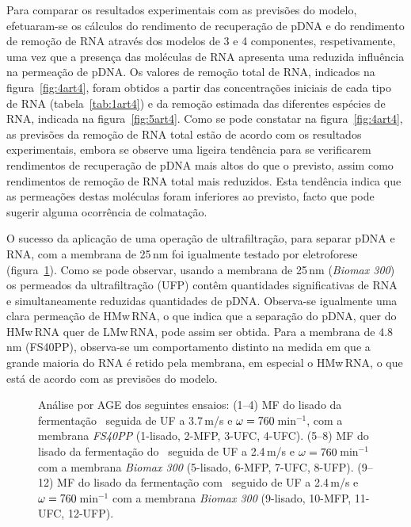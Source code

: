 Para comparar os resultados experimentais com as previsões do modelo, efetuaram-se os cálculos do rendimento de recuperação de pDNA e do rendimento de remoção de RNA através dos modelos de 3 e 4 componentes, respetivamente, uma vez que a presença das moléculas de RNA apresenta uma reduzida influência na permeação de pDNA. Os valores de remoção total de RNA, indicados na figura~\ref{fig:4art4}, foram obtidos a partir das concentrações iniciais de cada tipo de RNA (tabela~\ref{tab:1art4}) e da remoção estimada das diferentes espécies de RNA, indicada na figura~\ref{fig:5art4}. Como se pode constatar na figura~\ref{fig:4art4}, as previsões da remoção de RNA total estão de acordo com os resultados experimentais, embora se observe uma ligeira tendência para se verificarem rendimentos de recuperação de pDNA mais altos do que o previsto, assim como rendimentos de remoção de RNA total mais reduzidos.
%
%
Esta tendência indica que as permeações destas moléculas foram inferiores ao previsto, facto que pode sugerir alguma ocorrência de colmatação. 

O sucesso da aplicação de uma operação de ultrafiltração, para separar pDNA e RNA, com a membrana de 25\,nm foi igualmente testado por eletroforese (figura~\ref{fig:6art4}). Como se pode observar, usando a membrana de 25\,nm (\emph{Biomax 300}) os permeados da ultrafiltração (UFP) contêm quantidades significativas de RNA e simultaneamente reduzidas quantidades de pDNA. Observa-se igualmente uma clara permeação de HMw\,RNA, o que indica que a separação do pDNA, quer do HMw\,RNA quer de LMw\,RNA, pode assim ser obtida. Para a membrana de 4.8\,nm (FS40PP), observa-se um comportamento distinto na medida em que a grande maioria do RNA é retido pela membrana, em especial o HMw\,RNA, o que está de acordo com as previsões do modelo.
%
%
%
%
\begin{figure}
	\centering
	
	\caption[Análise por eletroforese em gel de agarose dos ensaios de ultrafiltração.]{Análise por AGE dos seguintes ensaios: (1--4) MF do lisado da fermentação \pVAX\ seguida de UF a 3.7\,\micro m/s e $\omega=760$\,min$^{-1}$, com a membrana \emph{FS40PP} (1-lisado, 2-MFP, 3-UFC, 4-UFC). (5--8) MF do lisado da fermentação do \pVAX\ seguida de UF a 2.4\,\micro m/s e $\omega=760$\,min$^{-1}$ com a membrana \emph{Biomax 300} (5-lisado, 6-MFP, 7-UFC, 8-UFP). (9--12) MF do lisado da fermentação com \pCAMBIA\ seguido de UF a 2.4\,\micro m/s e $\omega=760$\,min$^{-1}$ com a membrana \emph{Biomax 300} (9-lisado, 10-MFP, 11-UFC, 12-UFP).}
	\label{fig:6art4}
\end{figure}

